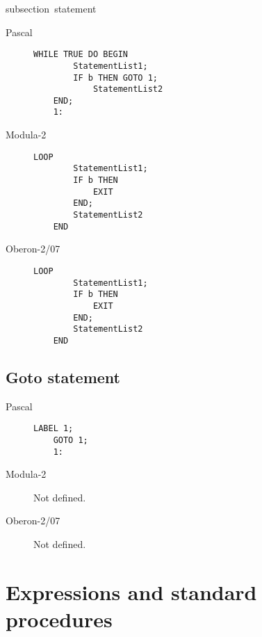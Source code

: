 \documentclass[10pt]{article}
\begin{document}
subsection{\EXIT\ statement}

\begin{description}
    \item[Pascal] 
    \begin{lstlisting}[style=example]   
    WHILE TRUE DO BEGIN 
        StatementList1;
        IF b THEN GOTO 1; 
            StatementList2
    END; 
    1:  
    \end{lstlisting}
    
    \item[Modula-2] 
    \begin{lstlisting}[style=example]   
    LOOP
        StatementList1;
        IF b THEN 
            EXIT 
        END; 
        StatementList2
    END    
    \end{lstlisting}
    
    \item[Oberon-2/07] 
    \begin{lstlisting}[style=example]   
    LOOP
        StatementList1;
        IF b THEN 
            EXIT 
        END; 
        StatementList2
    END    
    \end{lstlisting}
\end{description}

\subsection{Goto statement}

\begin{description}
    \item[Pascal] 
    \begin{lstlisting}[style=example]   
    LABEL 1; 
    GOTO 1; 
    1:
    \end{lstlisting}
    
    \item[Modula-2] Not defined.
    
    \item[Oberon-2/07] Not defined.
\end{description}

\section{Expressions and standard procedures}
\end{document}
